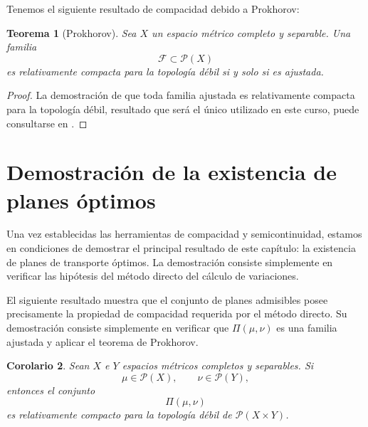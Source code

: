 \documentclass[12pt, a4paper]{amsbook}
\newtheorem{teo}{Teorema}[section]
\newtheorem{cor}[teo]{Corolario}
\theoremstyle{remark}
\theoremstyle{definition}
\numberwithin{section}{chapter}
\numberwithin{subsection}{section}
\numberwithin{equation}{section}
\numberwithin{figure}{chapter}
\begin{document}
Tenemos el siguiente resultado de compacidad debido a Prokhorov:
\begin{teo}[Prokhorov]\label{teo.Prokhorov}
Sea \(X\) un espacio métrico completo y separable. Una familia
\[
\mathcal F\subset\mathcal P(X)
\]
es relativamente compacta para la topología débil si y solo si es ajustada.
\end{teo}

\begin{proof}
La demostración de que toda familia ajustada es relativamente compacta para la topología débil, resultado que será el único utilizado en este curso, puede consultarse en \cite[Theorem 5.1]{Billingsley}.
\end{proof}

\section{Demostración de la existencia de planes óptimos}
Una vez establecidas las herramientas de compacidad y semicontinuidad, estamos en condiciones de demostrar el principal resultado de este capítulo: la existencia de planes de transporte óptimos. La demostración consiste simplemente en verificar las hipótesis del método directo del cálculo de variaciones.

El siguiente resultado muestra que el conjunto de planes admisibles posee precisamente la propiedad de compacidad requerida por el método directo. Su demostración consiste simplemente en verificar que \(\Pi(\mu,\nu)\) es una familia ajustada y aplicar el teorema de Prokhorov.

\begin{cor}\label{cor.Pi.compacto}
Sean \(X\) e \(Y\) espacios métricos completos y separables. Si
\[
\mu\in\mathcal P(X),
\qquad
\nu\in\mathcal P(Y),
\]
entonces el conjunto
\[
\Pi(\mu,\nu)
\]
es relativamente compacto para la topología débil de \(\mathcal P(X\times Y)\).
\end{cor}
\end{document}
